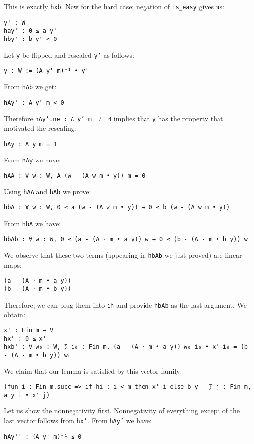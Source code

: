 \documentclass[]{article}
\renewcommand{\.}{\hskip .75pt}
\begin{document}
This is exactly \texttt{hxb}. \newpage \noindent
Now for the hard case; negation of \texttt{is\_easy} gives us:
\begin{lstlisting}
y' : W
hay' : 0 ≤ a y'
hby' : b y' < 0
\end{lstlisting}
Let \texttt{y} be flipped and rescaled \texttt{y'} as follows:
\begin{lstlisting}
y : W := (A y' m)⁻¹ • y'
\end{lstlisting}
From \texttt{hAb} we get:
\begin{lstlisting}
hAy' : A y' m < 0
\end{lstlisting}
Therefore \texttt{hAy'.ne :~A y' m $\neq$ 0}
implies that \texttt{y} has the property that motivated the rescaling:
\begin{lstlisting}
hAy : A y m = 1
\end{lstlisting}
From \texttt{hAy} we have:
\begin{lstlisting}
hAA : ∀ w : W, A (w - (A w m • y)) m = 0
\end{lstlisting}
Using \texttt{hAA} and \texttt{hAb} we prove:
\begin{lstlisting}
hbA : ∀ w : W, 0 ≤ a (w - (A w m • y)) → 0 ≤ b (w - (A w m • y))
\end{lstlisting}
From \texttt{hbA} we have:
\begin{lstlisting}
hbAb : ∀ w : W, 0 ≤ (a - (A · m • a y)) w → 0 ≤ (b - (A · m • b y)) w
\end{lstlisting}
We observe that these two terms (appearing in \texttt{hbAb} we just proved) are linear maps:
\begin{lstlisting}
(a - (A · m • a y))
(b - (A · m • b y))
\end{lstlisting}
Therefore, we can plug them into \texttt{ih} and provide \texttt{hbAb} as the last argument.
We obtain:
\begin{lstlisting}
x' : Fin m → V
hx' : 0 ≤ x'
hxb' : ∀ w₀ : W, ∑ i₀ : Fin m, (a - (A · m • a y)) w₀ i₀ • x' i₀ = (b - (A · m • b y)) w₀
\end{lstlisting}
We claim that our lemma is satisfied by this vector family:
\begin{lstlisting}
(fun i : Fin m.succ => if hi : i < m then x' i else b y - ∑ j : Fin m, a y i • x' j)
\end{lstlisting}
Let us show the nonnegativity first.
Nonnegativity of everything except of the last vector follows from \texttt{hx'}.
From \texttt{hAy'} we have:
\begin{lstlisting}
hAy'' : (A y' m)⁻¹ ≤ 0
\end{lstlisting}
\end{document}

